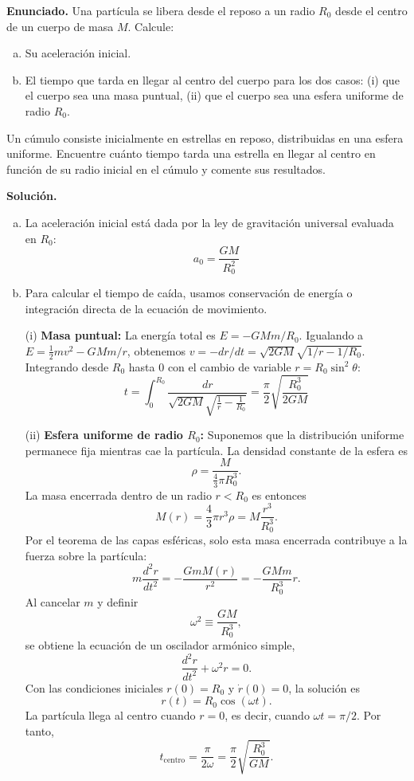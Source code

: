 \textbf{Enunciado.} Una partícula se libera desde el reposo a un radio $R_0$ desde el centro de un cuerpo de masa $M$. Calcule:
\begin{enumerate}[a)]
    \item Su aceleración inicial.
    \item El tiempo que tarda en llegar al centro del cuerpo para los dos casos: (i) que el cuerpo sea una masa puntual, (ii) que el cuerpo sea una esfera uniforme de radio $R_0$.
\end{enumerate}
Un cúmulo consiste inicialmente en estrellas en reposo, distribuidas en una esfera uniforme. Encuentre cuánto tiempo tarda una estrella en llegar al centro en función de su radio inicial en el cúmulo y comente sus resultados.

\textbf{Solución.}
\begin{enumerate}[a)]
    \item La aceleración inicial está dada por la ley de gravitación universal evaluada en $R_0$:
    $$ a_0 = \frac{GM}{R_0^2} $$

    \item Para calcular el tiempo de caída, usamos conservación de energía o integración directa de la ecuación de movimiento.
    
    (i) \textbf{Masa puntual:} La energía total es $E = -GMm/R_0$. Igualando a $E = \frac{1}{2}mv^2 - GMm/r$, obtenemos $v = -dr/dt = \sqrt{2GM}\sqrt{1/r - 1/R_0}$. Integrando desde $R_0$ hasta $0$ con el cambio de variable $r = R_0 \sin^2\theta$:
    $$ t = \int_0^{R_0} \frac{dr}{\sqrt{2GM}\sqrt{\frac{1}{r} - \frac{1}{R_0}}} = \frac{\pi}{2} \sqrt{\frac{R_0^3}{2GM}} $$
    
    (ii) \textbf{Esfera uniforme de radio $R_0$:} Suponemos que la distribución uniforme permanece fija mientras cae la partícula. La densidad constante de la esfera es
    $$
    \rho=\frac{M}{\frac{4}{3}\pi R_0^3}.
    $$
    La masa encerrada dentro de un radio $r<R_0$ es entonces
    $$
    M(r)=\frac{4}{3}\pi r^3\rho
    =M\frac{r^3}{R_0^3}.
    $$
    Por el teorema de las capas esféricas, solo esta masa encerrada contribuye a la fuerza sobre la partícula:
    $$
    m\frac{d^2r}{dt^2}
    =-\frac{GmM(r)}{r^2}
    =-\frac{GMm}{R_0^3}r.
    $$
    Al cancelar $m$ y definir
    $$
    \omega^2\equiv\frac{GM}{R_0^3},
    $$
    se obtiene la ecuación de un oscilador armónico simple,
    $$
    \frac{d^2r}{dt^2}+\omega^2r=0.
    $$
    Con las condiciones iniciales $r(0)=R_0$ y $\dot r(0)=0$, la solución es
    $$
    r(t)=R_0\cos(\omega t).
    $$
    La partícula llega al centro cuando $r=0$, es decir, cuando $\omega t=\pi/2$. Por tanto,
    $$
    t_{\mathrm{centro}}
    =\frac{\pi}{2\omega}
    =\frac{\pi}{2}\sqrt{\frac{R_0^3}{GM}}.
    $$


\end{enumerate}
